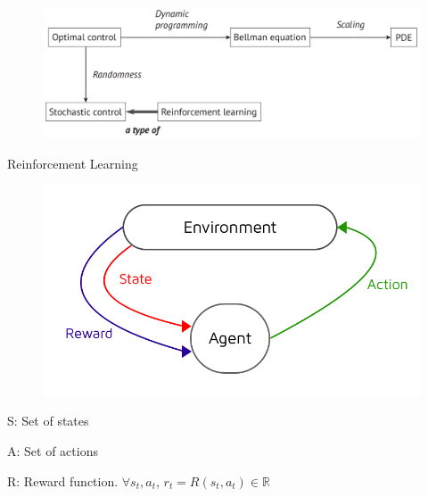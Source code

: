 \documentclass{beamer}
\begin{document}
\begin{frame}
\begin{figure}
\includegraphics[scale  = 0.35]{figures/bellman_ml.pdf}
\end{figure}
\end{frame}


\begin{frame}{Reinforcement Learning}
\begin{figure}
\includegraphics[scale = 0.3]{reinforcementlearning}
\end{figure}
S: Set of states

A: Set of actions

R: Reward function. $\forall s_t,a_t$, $r_t = R(s_t,a_t)\in \mathbb{R}$

  
\end{frame}
\end{document}

